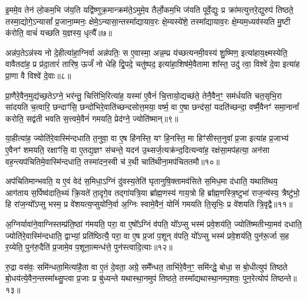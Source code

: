 इ॒ममे॒व तेन॑ लो॒कम॒भि ज॑य॒ति यद्वि॑ष्णुक्र॒मान्क्रम॑ते॒\-ऽमुमे॒व तैर्लो॒कम॒भि ज॑यति पूर्वे॒द्युः प्र क्रा॑मत्युत्तरे॒द्युरुप॑ तिष्ठते॒ तस्मा॒द्योगे॒\-ऽन्यासां᳚ प्र॒जाना॒म्मनः॒ क्षेमे॒\-ऽन्यासा॒न्तस्मा᳚द्यायाव॒रः क्षे॒म्यस्ये॑शे॒ तस्मा᳚द्यायाव॒रः क्षे॒म्यम॒ध्यव॑स्यति मु॒ष्टी क॑रोति॒ वाचं॑ यच्छति य॒ज्ञस्य॒ धृत्यै᳚॥७॥

{}

अन्न॑प॒ते\-ऽन्न॑स्य नो दे॒हीत्या॑हा॒ग्निर्वा अन्न॑पतिः॒ स ए॒वास्मा॒ अन्न॒म्प्र य॑च्छत्यनमी॒वस्य॑ शु॒ष्मिण॒ इत्या॑हाय॒क्ष्मस्येति॒ वावैतदा॑ह॒ प्र प्र॑दा॒तारं॑ तारिष॒ ऊर्जं॑ नो धेहि द्वि॒पदे॒ चतु॑ष्पद॒ इत्या॑हा॒शिष॑मे॒वैतामा शा᳚स्त॒ उदु॑ त्वा॒ विश्वे॑ दे॒वा इत्या॑ह प्रा॒णा वै विश्वे॑ दे॒वाः॥८॥

प्रा॒णैरे॒वैन॒मुद्य॑च्छ॒ते\-ऽग्ने॒ भर॑न्तु॒ चित्ति॑भि॒रित्या॑ह॒ यस्मा॑ ए॒वैनं॑ चि॒त्तायो॒द्यच्छ॑ते॒ तेनै॒वैन॒ꣳ॒ सम॑र्धयति चत॒सृभि॒रा सा॑दयति च॒त्वारि॒ छन्दाꣳ॑सि॒ छन्दो॑भिरे॒वाति॑च्छन्दसोत्त॒मया॒ वर्ष्म॒ वा ए॒षा छन्द॑सां॒ यदति॑च्छन्दा॒ वर्ष्मै॒वैनꣳ॑ समा॒नानां᳚ करोति॒ सद्व॑ती भवति स॒त्त्वमे॒वैनं॑ गमयति॒ प्रेद॑ग्ने॒ ज्योति॑ष्मान्॥९॥

या॒हीत्या॑ह॒ ज्योति॑रे॒वास्मि॑न्दधाति त॒नुवा॒ वा ए॒ष हि॑नस्ति॒ यꣳ हि॒नस्ति॒ मा हिꣳ॑सीस्त॒नुवा᳚ प्र॒जा इत्या॑ह प्र॒जाभ्य॑ ए॒वैनꣳ॑ शमयति॒ रक्षाꣳ॑सि॒ वा ए॒तद्य॒ज्ञꣳ स॑चन्ते॒ यदन॑ उ॒थ्सर्ज॒त्यक्र॑न्द॒दित्यन्वा॑ह॒ रक्ष॑सा॒मप॑हत्या॒ अन॑सा वह॒न्त्यप॑चितिमे॒वास्मि॑न्दधाति॒ तस्मा॑दन॒स्वी च॑ र॒थी चाति॑थीना॒मप॑चिततमौ॥१०॥

अप॑चितिमान्भवति॒ य ए॒वं वेद॑ स॒मिधा॒\-ऽग्निं दु॑वस्य॒तेति॑ घृतानुषि॒क्तामव॑सिते स॒मिध॒मा द॑धाति॒ यथाति॑थय॒ आग॑ताय स॒र्पिष्व॑दाति॒थ्यं क्रि॒यते॑ ता॒दृगे॒व तद्गा॑यत्रि॒या ब्रा᳚ह्म॒णस्य॑ गाय॒त्रो हि ब्रा᳚ह्म॒णस्त्रि॒ष्टुभा॑ राज॒न्य॑स्य॒ त्रैष्टु॑भो॒ हि रा॑ज॒न्यो᳚\-ऽप्सु भस्म॒ प्र वे॑शयत्य॒प्सुयो॑नि॒र्वा अ॒ग्निः स्वामे॒वैनं॒ योनिं॑ गमयति ति॒सृभिः॒ प्र वे॑शयति त्रि॒वृद्वै॥११॥

अ॒ग्निर्यावा॑ने॒वाग्निस्तम्प्र॑ति॒ष्ठां ग॑मयति॒ परा॒ वा ए॒षो᳚\-ऽग्निं व॑पति॒ यो᳚\-ऽप्सु भस्म॑ प्रवे॒शय॑ति॒ ज्योति॑ष्मतीभ्या॒मव॑ दधाति॒ ज्योति॑रे॒वास्मि॑न्दधाति॒ द्वाभ्यां॒ प्रति॑ष्ठित्यै॒ परा॒ वा ए॒ष प्र॒जां प॒शून् व॑पति॒ यो᳚\-ऽप्सु भस्म॑ प्रवे॒शय॑ति॒ पुन॑रू॒र्जा स॒ह र॒य्येति॒ पुन॑रु॒दैति॑ प्र॒जामे॒व प॒शूना॒त्मन्ध॑त्ते॒ पुन॑स्त्वादि॒त्याः॥१२॥

रु॒द्रा वस॑वः॒ समि॑न्धता॒मित्या॑है॒ता वा ए॒तं दे॒वता॒ अग्रे॒ समै᳚न्धत॒ ताभि॑रे॒वैन॒ꣳ॒ समि॑न्द्धे॒ बोधा॒ स बो॒धीत्युप॑ तिष्ठते बो॒धय॑त्ये॒वैन॒न्तस्मा᳚थ्सु॒प्त्वा प्र॒जाः प्र बु॑ध्यन्ते यथास्था॒नमुप॑ तिष्ठते॒ तस्मा᳚द्यथास्था॒नम्प॒शवः॒ पुन॒रेत्योप॑ तिष्ठन्ते॥१३॥


